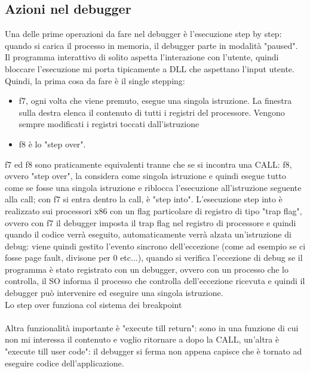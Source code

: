 \documentclass[12pt, oneside]{extbook}
\begin{document}
\subsection{Azioni nel debugger}
Una delle prime operazioni da fare nel debugger è l'esecuzione step by step: quando si carica il processo in memoria, il debugger parte in modalità "paused". Il programma interattivo di solito aspetta l'interazione con l'utente, quindi bloccare l'esecuzione mi porta tipicamente a DLL che aspettano l'input utente. Quindi, la prima cosa da fare è il single stepping:
\begin{itemize}
\item f7, ogni volta che viene premuto, esegue una singola istruzione. La finestra sulla destra elenca il contenuto di tutti i registri del processore. Vengono sempre modificati i registri toccati dall'istruzione
\item f8 è lo "step over".
\end{itemize}
f7 ed f8 sono praticamente equivalenti tranne che se si incontra una CALL: f8, ovvero "step over", la considera come singola istruzione e quindi esegue tutto come se fosse una singola istruzione e riblocca l'esecuzione all'istruzione seguente alla call; con f7 si entra dentro la call, è "step into". L'esecuzione step into è realizzato sui processori x86 con un flag particolare di registro di tipo "trap flag", ovvero con f7 il debugger imposta il trap flag nel registro di processore e quindi quando il codice verrà eseguito, automaticamente verrà alzata un'istruzione di debug: viene quindi gestito l'evento sincrono dell'eccezione (come ad esempio se ci fosse page fault, divisone per 0 etc...), quando si verifica l'eccezione di debug se il programma è stato registrato con un debugger, ovvero con un processo che lo controlla, il SO informa il processo che controlla dell'eccezione ricevuta e quindi il debugger può intervenire ed eseguire una singola istruzione.\\ Lo step over funziona col sistema dei breakpoint\\\\ 
Altra funzionalità importante è "execute till return": sono in una funzione di cui non mi interessa il contenuto e voglio ritornare a dopo la CALL, un'altra è "execute till user code": il debugger si ferma non appena capisce che è tornato ad eseguire codice dell'applicazione.
\end{document}
